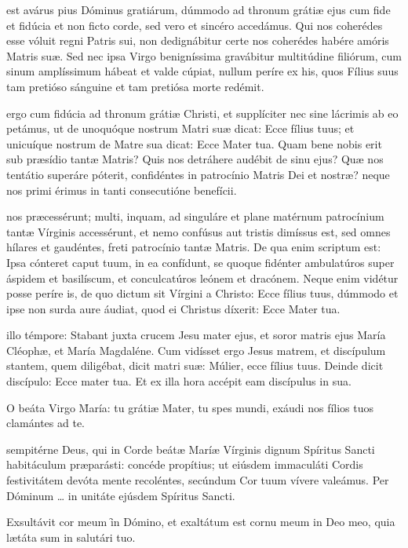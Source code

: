 \documentclass[fontsize=7.9pt,paper=A6,twoside,BCOR=1mm,DIV=24,headinclude]{scrarticle}
\begin{document}
\begin{multicols}{2}
{\mRVBMVix

 est avárus pius Dóminus gratiárum, dúmmodo ad thronum grátiæ ejus cum fide et fidúcia et non ficto corde, sed vero et sincéro accedámus. Qui nos coherédes esse vóluit regni Patris sui, non dedignábitur certe nos coherédes habére amóris Matris suæ.
Sed nec ipsa Virgo benigníssima gravábitur multitúdine filiórum, cum sinum amplíssimum hábeat et valde cúpiat, nullum períre ex his, quos Fílius suus tam pretióso sánguine et tam pretiósa morte redémit.

\mRVBMVx

 ergo cum fidúcia ad thronum grátiæ Christi, et supplíciter nec sine lácrimis ab eo petámus, ut de unoquóque nostrum Matri suæ dicat: Ecce fílius tuus; et unicuíque nostrum de Matre sua dicat: Ecce Mater tua.
Quam bene nobis erit sub præsídio tantæ Matris? Quis nos detráhere audébit de sinu ejus? Quæ nos tentátio superáre póterit, confidéntes in patrocínio Matris Dei et nostræ? neque nos primi érimus in tanti consecutióne benefícii.

\mRVBMVxi

 nos præcessérunt; multi, inquam, ad singuláre et plane matérnum patrocínium tantæ Vírginis accessérunt, et nemo confúsus aut tristis dimíssus est, sed omnes hílares et gaudéntes, freti patrocínio tantæ Matris. De qua enim scriptum est: Ipsa cónteret caput tuum, in ea confídunt, se quoque fidénter ambulatúros super áspidem et basilíscum, et conculcatúros leónem et dracónem. Neque enim vidétur posse períre is, de quo dictum sit Vírgini a Christo: Ecce fílius tuus, dúmmodo et ipse non surda aure áudiat, quod ei Christus díxerit: Ecce Mater tua.

\mRVBMVxii

 illo témpore: Stabant juxta crucem Jesu mater ejus, et soror matris ejus María Cléophæ, et María Magdaléne. Cum vidísset ergo Jesus matrem, et discípulum stantem, quem diligébat, dicit matri suæ: Múlier, ecce fílius tuus. Deinde dicit discípulo: Ecce mater tua. Et ex illa hora accépit eam discípulus in sua.


\VRBMVii 

\B O beáta Virgo \f María: tu grátiæ Mater, tu spes mundi, exáudi nos fílios tuos clamántes ad te.

 sempitérne Deus, qui in Corde beátæ Maríæ Vírginis dignum Spíritus Sancti habitáculum præparásti: concéde propítius; ut eiúsdem immaculáti Cordis festivitátem devóta mente recoléntes, secúndum Cor tuum vívere valeámus. Per Dóminum … in unitáte ejúsdem Spíritus Sancti.


\VRBMViii 

\M Exsultávit cor meum \f in Dómino, et exaltátum est cornu meum in Deo meo, quia lætáta sum in salutári tuo.

}

\end{multicols}

\end{document}
